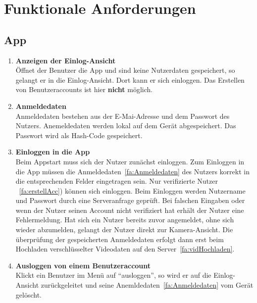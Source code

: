\chapter{Funktionale Anforderungen}

\section{\gls{App}}
\begin{enumerate}
\renewcommand{\labelenumi}{\textbf{\theenumi}}
\renewcommand{\theenumi}{FA\arabic{enumi}0}
\setcounter{enumi}{99}
\item \textbf{Anzeigen der Einlog-Ansicht} \hfill \\
Öffnet der Benutzer die \gls{App} und sind keine Nutzerdaten gespeichert, so gelangt er in die Einlog-Ansicht. Dort kann er sich einloggen. Das Erstellen von Benutzeraccounts ist hier \textbf{nicht} möglich.

\item \label{fa:Anmeldedaten}\textbf{Anmeldedaten} \hfill \\
Anmeldedaten bestehen aus der E-Mai-Adresse und dem Passwort des Nutzers. Anemeldedaten werden lokal auf dem Gerät abgespeichert. Das Passwort wird als \gls{Hash-Code} gespeichert.

\item \textbf{Einloggen in die \gls{App}} \hfill \\
Beim Appstart muss sich der Nutzer zunächst einloggen. Zum Einloggen in die \gls{App} müssen die Anmeldedaten~\eqref{fa:Anmeldedaten} des Nutzers korrekt in die entsprechenden Felder eingetragen sein. Nur verifizierte Nutzer ~\eqref{fa:erstellAcc}) können sich einloggen. Beim Einloggen werden Nutzername und Passwort durch eine Serveranfrage geprüft. Bei falschen Eingaben oder wenn der Nutzer seinen Account nicht verifiziert hat erhält der Nutzer eine Fehlermeldung. Hat sich ein Nutzer bereits zuvor angemeldet, ohne sich wieder abzumelden, gelangt der Nutzer direkt zur Kamera-Ansicht. Die überprüfung der gespeicherten Anmeldedaten erfolgt dann erst beim Hochladen verschlüsselter Videodaten auf den Server~\eqref{fa:vidHochladen}.

\item \label{fa:logOut}\textbf{Ausloggen von einem Benutzeraccount} \hfill \\
Klickt ein Benutzer im Menü auf ``ausloggen'', so wird er auf die Einlog-Ansicht zurückgeleitet und seine Anemldedaten~\eqref{fa:Anmeldedaten} vom Gerät gelöscht.


\end{enumerate}
